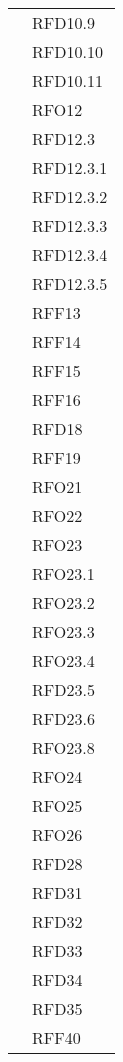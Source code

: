 \begin{longtable}{|>{\centering}m{10cm}|m{3cm}<{\centering}|}
& RFD10.9\\
& RFD10.10\\
& RFD10.11\\
& RFO12\\
& RFD12.3\\
& RFD12.3.1\\
& RFD12.3.2\\
& RFD12.3.3\\
& RFD12.3.4\\
& RFD12.3.5\\
& RFF13\\
& RFF14\\
& RFF15\\
& RFF16\\
& RFD18\\
& RFF19\\
& RFO21\\
& RFO22\\
& RFO23\\
& RFO23.1\\
& RFO23.2\\
& RFO23.3\\
& RFO23.4\\
& RFD23.5\\
& RFD23.6\\
& RFO23.8\\
& RFO24\\
& RFO25\\
& RFO26\\
& RFD28\\
& RFD31\\
& RFD32\\
& RFD33\\
& RFD34\\
& RFD35\\
& RFF40\\ \hline


\end{longtable}

